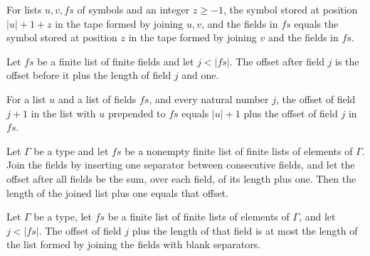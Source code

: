 \begin{theorem}
\label{Turing.fieldsTape_cons_shift}
\leanok
{}
For lists $u,v,fs$ of symbols and an integer $z\ge -1$, the symbol stored at position
$|u|+1+z$ in the tape formed by joining $u,v$, and the fields in $fs$ equals the symbol
stored at position $z$ in the tape formed by joining $v$ and the fields in $fs$.
\end{theorem}

\begin{theorem}
\label{Turing.fieldOffset_succ}
\leanok
{}
Let $fs$ be a finite list of finite fields and let $j<|fs|$. The offset after field $j$
is the offset before it plus the length of field $j$ and one.
\end{theorem}

\begin{theorem}
\label{Turing.fieldOffset_cons_succ}
\leanok
{}
For a list $u$ and a list of fields $fs$, and every natural number $j$, the offset of
field $j+1$ in the list with $u$ prepended to $fs$ equals $|u|+1$ plus the offset of
field $j$ in $fs$.
\end{theorem}

\begin{theorem}
\label{Turing.length_joinFields_add_one}
\leanok
{}
Let $\Gamma$ be a type and let $fs$ be a nonempty finite list of finite lists of
elements of $\Gamma$. Join the fields by inserting one separator between consecutive
fields, and let the offset after all fields be the sum, over each field, of its length
plus one. Then the length of the joined list plus one equals that offset.
\end{theorem}

\begin{theorem}
\label{Turing.fieldOffset_add_length_le}
\leanok
{}
Let $\Gamma$ be a type, let $fs$ be a finite list of finite lists of elements of
$\Gamma$, and let $j<|fs|$. The offset of field $j$ plus the length of that field is at
most the length of the list formed by joining the fields with blank separators.
\end{theorem}

